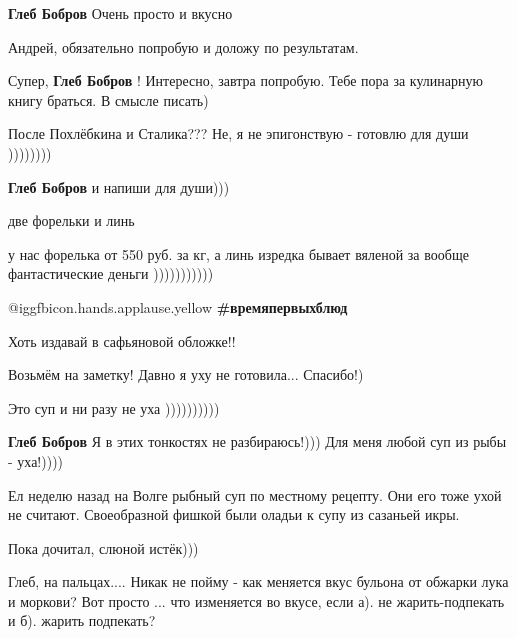 \begin{itemize}
\begin{itemize}
\textbf{Глеб Бобров}
Очень просто и вкусно

Андрей, обязательно попробую и доложу по результатам.

\end{itemize} %

Супер, \textbf{Глеб Бобров} !
Интересно, завтра попробую. Тебе пора за кулинарную книгу браться. В смысле писать)

\begin{itemize} %
После Похлёбкина и Сталика???
Не, я не эпигонствую - готовлю для души ))))))))

\textbf{Глеб Бобров} и напиши для души)))
\end{itemize} %

две форельки и линь

\begin{itemize} %
у нас форелька от 550 руб. за кг, а линь изредка бывает вяленой за вообще фантастические деньги )))))))))))
\end{itemize} %

 @igg{fbicon.hands.applause.yellow}  \textbf{\#времяпервыхблюд}

Хоть издавай в сафьяновой обложке!!

Возьмём на заметку! Давно я уху не готовила... Спасибо!)

\begin{itemize} %
Это суп и ни разу не уха ))))))))))

\textbf{Глеб Бобров} Я в этих тонкостях не разбираюсь!))) Для меня любой суп из рыбы - уха!))))
\end{itemize} %


Ел неделю назад на Волге рыбный суп по местному рецепту. Они его тоже ухой не
считают. Своеобразной фишкой были оладьи к супу из сазаньей икры.


Пока дочитал, слюной истёк)))


Глеб, на пальцах.... Никак не пойму - как меняется вкус бульона от обжарки лука
и моркови? Вот просто ... что изменяется во вкусе, если а). не жарить-подпекать
и б). жарить подпекать?

\begin{itemize} %


\end{itemize}
\end{itemize}
